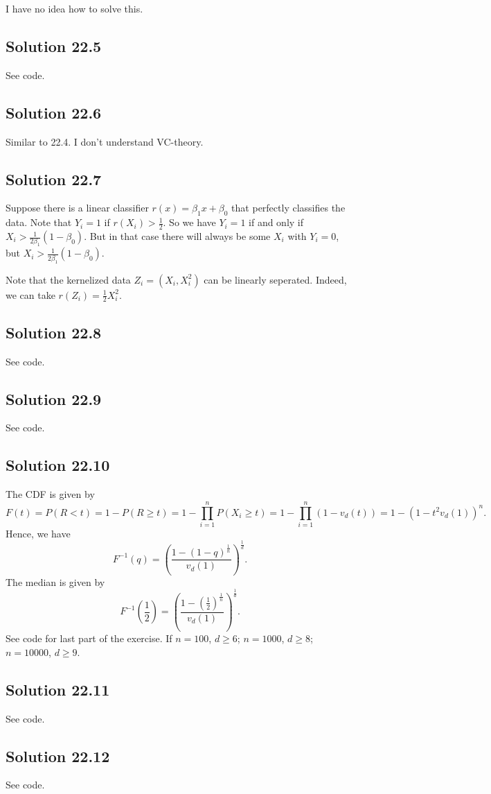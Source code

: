I have no idea how to solve this.


\subsection*{Solution 22.5}

See code.


\subsection*{Solution 22.6}

Similar to 22.4. I don't understand VC-theory.


\subsection*{Solution 22.7}

Suppose there is a linear classifier $r(x) = \beta_1 x + \beta_0$ that perfectly classifies the data.
Note that $Y_i = 1$ if $r(X_i) > \frac{1}{2}$.
So we have $Y_i = 1$ if and only if $X_i > \frac{1}{2 \beta_1} (1 - \beta_0)$.
But in that case there will always be some $X_i$ with $Y_i = 0$, but $X_i > \frac{1}{2 \beta_1} (1 - \beta_0)$.

Note that the kernelized data $Z_i = (X_i, X_i^2)$ can be linearly seperated.
Indeed, we can take $r(Z_i) = \frac{1}{2} X_i^2$.


\subsection*{Solution 22.8}

See code.


\subsection*{Solution 22.9}

See code.


\subsection*{Solution 22.10}

The CDF is given by
\begin{equation*}
    F(t) = P(R < t)
        = 1 - P(R \geq t)
        = 1 - \prod_{i = 1}^n P(X_i \geq t)
        = 1 - \prod_{i = 1}^n (1 - v_d(t))
        = 1 - (1 - t^2 v_d(1))^n.
\end{equation*}
Hence, we have
\begin{equation*}
    F^{-1}(q) = \left(\frac{1 - (1 - q)^{\frac{1}{n}}}{v_d(1)}\right)^{\frac{1}{d}}.
\end{equation*}
The median is given by
\begin{equation*}
    F^{-1}\left(\frac{1}{2}\right) = \left(\frac{1 - (\frac{1}{2})^{\frac{1}{n}}}{v_d(1)}\right)^{\frac{1}{d}}.
\end{equation*}
See code for last part of the exercise.
If $n = 100$, $d \geq 6$; $n = 1000$, $d \geq 8$; $n = 10000$, $d \geq 9$.


\subsection*{Solution 22.11}

See code.


\subsection*{Solution 22.12}

See code.
